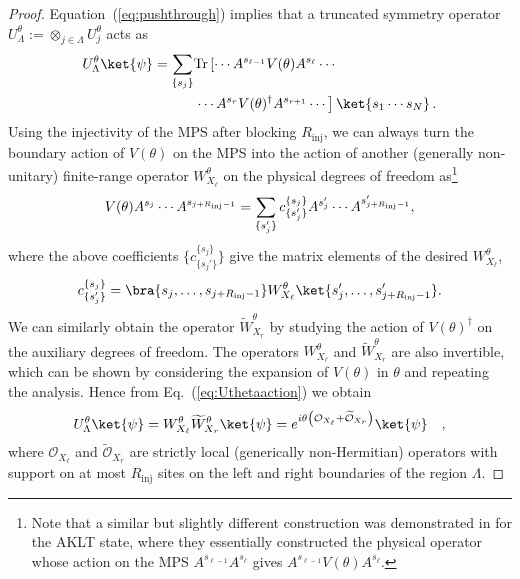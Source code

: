 \documentclass[prx,letterpaper,aps,superscriptaddress,floatfix,twocolumn,nofootinbib]{revtex4-2}
\theoremstyle{definition}
\newcommand{\defn}{:=}
\begin{document}
\begin{proof}
%
Equation~(\ref{eq:pushthrough}) implies that a truncated symmetry operator $U_{\Lambda}^\theta \defn \otimes_{j\in\Lambda}U_{j}^\theta$ acts as
\begin{align}
    U_{\Lambda}^\theta \ket{\psi}=\sum_{\{s_j\}}&\mathrm{Tr}\left[\cdots A^{s_{\ell-1}}V(\theta)A^{s_{\ell}}\cdots\right. \nonumber \\
    &\left.\cdots A^{s_{r}}V(\theta)^{\dagger}A^{s_{r+1}}\cdots\right]\ket{s_1\cdots s_N}\,.
    \label{eq:Uthetaaction}
\end{align}
%
Using the injectivity of the MPS after blocking $R_{\text{inj}}$, we can always turn the boundary action of $V(\theta)$ on the MPS into the action of another (generally non-unitary) finite-range operator $W^\theta_{X_\ell}$ on the physical degrees of freedom as\footnote{Note that a similar but slightly different construction was demonstrated in \cite{wang2024generalizedspinhelixstates} for the AKLT state, where they essentially constructed the physical operator whose action on the MPS $A^{s_{\ell-1}} A^{s_{\ell}}$ gives $A^{s_{\ell-1}} V(\theta) A^{s_{\ell}}$.}
\begin{align}
    V(\theta) A^{s_j} \cdots A^{s_{j+R_{\rm inj}-1}}=\sum_{\{s_j'\}}c^{\{s_j\}}_{\{s_j'\}}A^{s'_j} \cdots A^{s'_{j+R_{\rm inj}-1}},
\label{eq:Vthetaaction}
\end{align}
where the above coefficients $\{ c^{\{s_j\}}_{\{s_j'\}} \}$ give the matrix elements of the desired $W^\theta_{X_\ell}$,
\begin{equation}
    c^{\{s_j\}}_{\{s_j'\}} = \bra{s_j, \dots, s_{j+R_{\rm inj}-1}}W^\theta_{X_\ell}\ket{s_j',\dots,s_{j+R_{\rm inj}-1}'}.
\end{equation}
%
We can similarly obtain the operator $\widetilde{W}^\theta_{X_r}$ by studying the action of $V(\theta)^\dagger$ on the auxiliary degrees of freedom.
%
The operators $W^\theta_{X_\ell}$ and $\widetilde{W}^\theta_{X_r}$ are also invertible, which can be shown by considering the expansion of $V(\theta)$ in $\theta$ and repeating the analysis.
%
Hence from Eq.~(\ref{eq:Uthetaaction}) we obtain
\begin{align}
    U_{\Lambda}^\theta \ket{\psi}= W^\theta_{X_\ell} \widetilde{W}^\theta_{X_r} \ket{\psi} = e^{i\theta\left(\mathcal{O}_{X_\ell}+\mathcal{\widetilde{O}}_{X_r}\right)}\ket{\psi}\quad,
\label{eq:Uthetafinal}
\end{align}
where $\mathcal{O}_{X_\ell}$ and $\mathcal{\widetilde{O}}_{X_r}$ are strictly local (generically non-Hermitian) operators with support on at most $R_{\text{inj}}$ sites on the left and right boundaries of the region $\Lambda$.
%
\end{proof}
%
\end{document}
